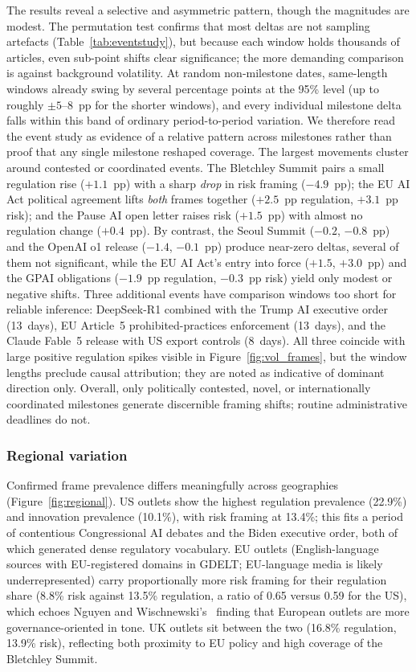 \documentclass[sigconf]{acmart}
\begin{document}
The results reveal a selective and asymmetric pattern, though the magnitudes are modest.
The permutation test confirms that most deltas are not sampling artefacts (Table~\ref{tab:eventstudy}), but because each window holds thousands of articles, even sub-point shifts clear significance; the more demanding comparison is against background volatility.
At random non-milestone dates, same-length windows already swing by several percentage points at the 95\% level (up to roughly $\pm5$--$8$~pp for the shorter windows), and every individual milestone delta falls within this band of ordinary period-to-period variation.
We therefore read the event study as evidence of a relative pattern across milestones rather than proof that any single milestone reshaped coverage.
The largest movements cluster around contested or coordinated events. The Bletchley Summit pairs a small regulation rise ($+1.1$~pp) with a sharp \emph{drop} in risk framing ($-4.9$~pp); the EU AI Act political agreement lifts \emph{both} frames together ($+2.5$~pp regulation, $+3.1$~pp risk); and the Pause AI open letter raises risk ($+1.5$~pp) with almost no regulation change ($+0.4$~pp).
By contrast, the Seoul Summit ($-0.2$, $-0.8$~pp) and the OpenAI o1 release ($-1.4$, $-0.1$~pp) produce near-zero deltas, several of them not significant, while the EU AI Act's entry into force ($+1.5$, $+3.0$~pp) and the GPAI obligations ($-1.9$~pp regulation, $-0.3$~pp risk) yield only modest or negative shifts.
Three additional events have comparison windows too short for reliable inference: DeepSeek-R1 combined with the Trump AI executive order (13~days), EU Article~5 prohibited-practices enforcement (13~days), and the Claude Fable~5 release with US export controls (8~days). All three coincide with large positive regulation spikes visible in Figure~\ref{fig:vol_frames}, but the window lengths preclude causal attribution; they are noted as indicative of dominant direction only.
Overall, only politically contested, novel, or internationally coordinated milestones generate discernible framing shifts; routine administrative deadlines do not.

\subsubsection{Regional variation}
Confirmed frame prevalence differs meaningfully across geographies (Figure~\ref{fig:regional}).
US outlets show the highest regulation prevalence (22.9\%) and innovation prevalence (10.1\%), with risk framing at 13.4\%; this fits a period of contentious Congressional AI debates and the Biden executive order, both of which generated dense regulatory vocabulary.
EU outlets (English-language sources with EU-registered domains in GDELT; EU-language media is likely underrepresented) carry proportionally more risk framing for their regulation share (8.8\% risk against 13.5\% regulation, a ratio of 0.65 versus 0.59 for the US), which echoes Nguyen and Wischnewski's~\cite{nguyen_generative_2026} finding that European outlets are more governance-oriented in tone.
UK outlets sit between the two (16.8\% regulation, 13.9\% risk), reflecting both proximity to EU policy and high coverage of the Bletchley Summit.
\end{document}
